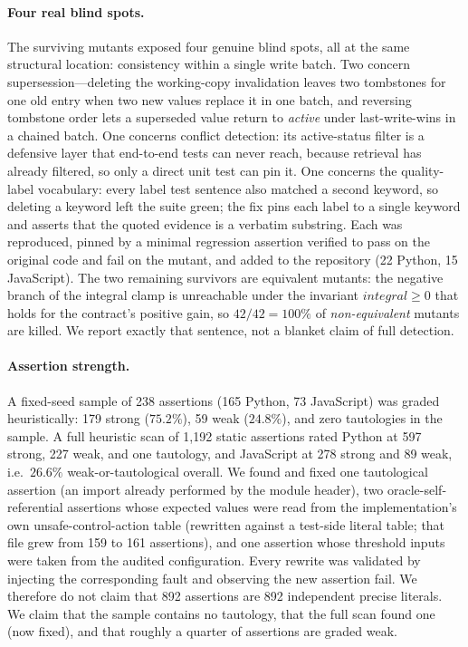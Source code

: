 \paragraph{Four real blind spots.} The surviving mutants exposed four genuine
blind spots, all at the same structural location: consistency within a single
write batch. Two concern supersession---deleting the working-copy invalidation
leaves two tombstones for one old entry when two new values replace it in one
batch, and reversing tombstone order lets a superseded value return to
\emph{active} under last-write-wins in a chained batch. One concerns conflict
detection: its active-status filter is a defensive layer that end-to-end tests
can never reach, because retrieval has already filtered, so only a direct unit
test can pin it. One concerns the quality-label vocabulary: every label test
sentence also matched a second keyword, so deleting a keyword left the suite
green; the fix pins each label to a single keyword and asserts that the quoted
evidence is a verbatim substring. Each was reproduced, pinned by a minimal
regression assertion verified to pass on the original code and fail on the
mutant, and added to the repository (22 Python, 15 JavaScript). The two remaining
survivors are equivalent mutants: the negative
branch of the integral clamp is unreachable under the invariant
$\mathit{integral}\ge 0$ that holds for the contract's positive gain, so
$42/42=100\%$ of \emph{non-equivalent} mutants are killed. We report exactly
that sentence, not a blanket claim of full detection.

\paragraph{Assertion strength.} A fixed-seed sample of 238 assertions (165
Python, 73 JavaScript) was graded heuristically: 179 strong
($75.2\%$), 59 weak ($24.8\%$), and zero tautologies in the sample. A full
heuristic scan of 1{,}192 static assertions rated Python at 597 strong, 227
weak, and one tautology, and JavaScript at 278 strong and 89 weak, i.e.\
$26.6\%$ weak-or-tautological overall. We found and fixed one tautological
assertion (an import already performed by the module header), two
oracle-self-referential assertions whose expected values were read from the
implementation's own unsafe-control-action table (rewritten against a test-side
literal table; that file grew from 159 to 161 assertions), and one assertion
whose threshold inputs were taken from the audited configuration. Every rewrite
was validated by injecting the corresponding fault and observing the new
assertion fail. We therefore do not claim that 892 assertions are 892
independent precise literals. We claim that the sample contains no tautology,
that the full scan found one (now fixed), and that roughly a quarter of
assertions are graded weak.

